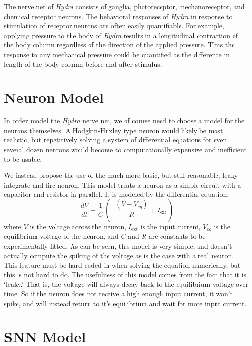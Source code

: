 \documentclass{article}
\begin{document}
The nerve net of \textit{Hydra} consists of ganglia, photoreceptor, mechanoreceptor, and chemical receptor neurons. The behavioral responses of \textit{Hydra} in response to stimulation of receptor neurons are often easily quantifiable. For example, applying pressure to the body of \textit{Hydra} results in a longitudinal contraction of the body column regardless of the direction of the applied pressure. Thus the response to any mechanical pressure could be quantified as the difference in length of the body column before and after stimulus.
\newpage

\section{Neuron Model}
In order model the \textit{Hydra} nerve net, we of course need to choose a model for the neurons themselves. A Hodgkin-Huxley type neuron would likely be most realistic, but repetitively solving a system of differential equations for even several dozen neurons would become to computationally expensive and inefficient to be usable.

We instead propose the use of the much more basic, but still reasonable, leaky integrate and fire neuron. This model treats a neuron as a simple circuit with a capacitor and resistor in parallel. It is modeled by the differential equation:
\begin{equation*}
\frac{dV}{dt}=\frac{1}{C}\left(-\frac{(V-V_{eq})}{R}+I_{\mathrm{ext}}\right)
\end{equation*}
where $V$ is the voltage across the neuron, $I_{\mathrm{ext}}$ is the input current, $V_{eq}$ is the equilibrium voltage of the neuron, and $C$ and $R$ are constants to be experimentally fitted. 
As can be seen, this model is very simple, and doesn't actually compute the spiking of the voltage as is the case with a real neuron. This feature must be hard coded in when solving the equation numerically, but this is not hard to do. The usefulness of this model comes from the fact that it is `leaky.' That is, the voltage will always decay back to the equilibrium voltage over time. So if the neuron does not receive a high enough input current, it won't spike, and will instead return to it's equilibrium and wait for more input current.
\newpage

\section{SNN Model}
\newpage
\end{document}
